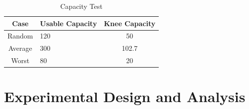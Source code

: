 		\begin{table}
			\footnotesize
			\caption{Capacity Test}
			\label{tab:ct}
			\centering
			\begin{tabular}{cp{}c}
				\toprule
				\textbf{Case} &
				\textbf{Usable Capacity} &
				\textbf{Knee Capacity}\\
				\midrule
				Random &
				120 &
				50\\
				\midrule
				Average &
				300 &
				102.7\\
				\midrule
				Worst &
				80 &
				20\\
				\bottomrule			
			\end{tabular}
		\end{table}
	
	\section{Experimental Design and Analysis}